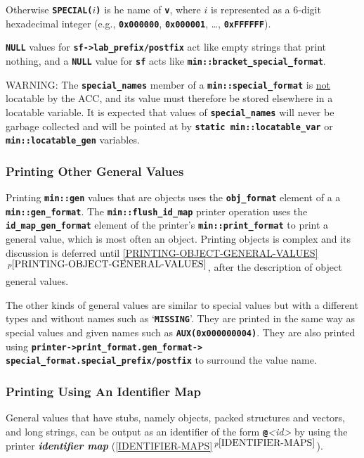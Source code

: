 \documentclass[12pt]{article}
\newcommand{\TT}[1]{{\tt \bfseries #1}}
\newcommand{\key}[1]{{\bf \em #1}\index{#1}}
\newcommand{\itemref}[1]{\ref{#1}$\,^{p\pageref{#1}}$}
\newcommand{\EOL}{\penalty \exhyphenpenalty}
\begin{document}
Otherwise
\TT{SPECIAL(}$i$\TT{)} is he name of \TT{v}, where $i$ is represented as
a 6-digit hexadecimal integer (e.g., \TT{0x000000}, \TT{0x000001},
\ldots, \TT{0xFFFFFF}).

\TT{NULL} values for
\TT{sf->\EOL lab\_\EOL prefix/postfix} act like empty strings
that print nothing, and a \TT{NULL} value for \TT{sf} acts like
\TT{min::\EOL bracket\_\EOL special\_\EOL format}.

WARNING: The \TT{special\_\EOL names} member of a \TT{min::special\_format} is
\underline{not} locatable by the ACC, and its value must therefore be
stored elsewhere in a locatable variable.  It is expected that values of
\TT{special\_\EOL names} will never be garbage collected and
will be pointed at by \TT{static min::\EOL locatable\_\EOL var} or
\TT{min::\EOL locatable\_\EOL gen} variables.

\subsubsection{Printing Other General Values}
\label{PRINTING-OTHER-GENERAL-VALUES}

Printing \TT{min::gen} values that are objects
uses the \TT{obj\_\EOL format} element of a
a \TT{min::\EOL gen\_\EOL format}.
The \TT{min::\EOL flush\_\EOL id\_\EOL map} printer operation uses
the \TT{id\_\EOL map\_\EOL gen\_\EOL format} element of
the printer's \TT{min::\EOL print\_\EOL format}
to print a general value, which is most often an object.
Printing objects is complex and
its discussion is deferred until \itemref{PRINTING-OBJECT-GENERAL-VALUES},
after the description of object general values.

The other kinds of general values are similar to special values but
with a different types and without names such as `\TT{MISSING}'.
They are printed in the same way as special values and given
names such as \TT{AUX(0x000000004)}.  They are also printed using
\TT{printer->\EOL print\_\EOL format.gen\_\EOL format->\EOL
special\_\EOL format.special\_\EOL prefix/\EOL postfix}
to surround the value name.


\subsubsection{Printing Using An Identifier Map}
\label{PRINTING-USING-AN-IDENTIFIER-MAP}

General values that have stubs, namely objects, packed structures and vectors,
and long strings, can be
output as an identifier of the form \TT{@}{\em <id>} by using
the printer \key{identifier map} (\itemref{IDENTIFIER-MAPS}).
\end{document}
